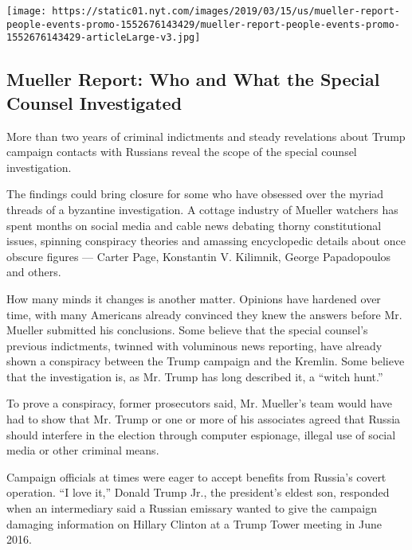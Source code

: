 \href{https://www.nytimes.com/interactive/2019/03/20/us/politics/mueller-investigation-people-events.html}{}

\texttt{[image: https://static01.nyt.com/images/2019/03/15/us/mueller-report-people-events-promo-1552676143429/mueller-report-people-events-promo-1552676143429-articleLarge-v3.jpg]}

\hypertarget{mueller-report-who-and-what-the-special-counsel-investigated}{%
\subsection{Mueller Report: Who and What the Special Counsel
Investigated}\label{mueller-report-who-and-what-the-special-counsel-investigated}}

More than two years of criminal indictments and steady revelations about
Trump campaign contacts with Russians reveal the scope of the special
counsel investigation.

The findings could bring closure for some who have obsessed over the
myriad threads of a byzantine investigation. A cottage industry of
Mueller watchers has spent months on social media and cable news
debating thorny constitutional issues, spinning conspiracy theories and
amassing encyclopedic details about once obscure figures --- Carter
Page, Konstantin V. Kilimnik, George Papadopoulos and others.

How many minds it changes is another matter. Opinions have hardened over
time, with many Americans already convinced they knew the answers before
Mr. Mueller submitted his conclusions. Some believe that the special
counsel's previous indictments, twinned with voluminous news reporting,
have already shown a conspiracy between the Trump campaign and the
Kremlin. Some believe that the investigation is, as Mr. Trump has long
described it, a ``witch hunt.''

To prove a conspiracy, former prosecutors said, Mr. Mueller's team would
have had to show that Mr. Trump or one or more of his associates agreed
that Russia should interfere in the election through computer espionage,
illegal use of social media or other criminal means.

Campaign officials at times were eager to accept benefits from Russia's
covert operation. ``I love it,'' Donald Trump Jr., the president's
eldest son, responded when an intermediary said a Russian emissary
wanted to give the campaign damaging information on Hillary Clinton at a
Trump Tower meeting in June 2016.

